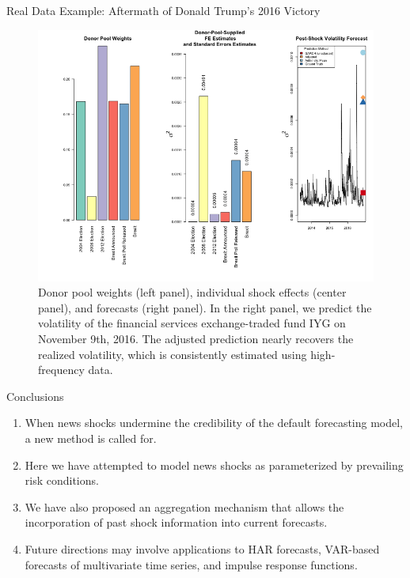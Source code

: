 \documentclass{beamer} %
\begin{document}
\begin{frame}[t]
\begin{columns}[t]
\begin{column}{0.465\textwidth}
\begin{block}{Real Data Example: Aftermath of Donald Trump's 2016 Victory}
	\begin{figure}
		\includegraphics[width=\linewidth]{../real_data_output_plots/WedSep182237432024_IYG_None_None.png}
		\caption{Donor pool weights (left panel), individual shock effects (center panel), and forecasts (right panel).  In the right panel, we predict the volatility of the financial services exchange-traded fund IYG on November 9th, 2016.  The adjusted prediction nearly recovers the realized volatility, which is consistently estimated using high-frequency data.} 
	\end{figure}
\end{block}


\begin{block}{Conclusions}
	\begin{enumerate}
		\item When news shocks undermine the credibility of the default forecasting model, a new method is called for.
		\item Here we have attempted to model news shocks as parameterized by prevailing risk conditions.
		\item We have also proposed an aggregation mechanism that allows the incorporation of past shock information into current forecasts.
		\item Future directions may involve applications to HAR forecasts, VAR-based forecasts of multivariate time series, and impulse response functions.
	\end{enumerate}
\end{block}


\end{column}
\end{columns}
\end{frame}
\end{document}
